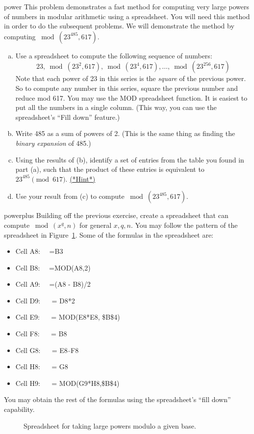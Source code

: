 \begin{exercise}{power}
This problem demonstrates a fast method for computing very large powers of numbers in modular arithmetic using a spreadsheet.  You will need this method in order to do the subsequent problems. We will demonstrate the method by computing $\bmod(23^{485} ,617)$.
\begin{enumerate}[(a)]
\item
Use a spreadsheet to compute the following sequence of numbers:
\[ 23, \bmod(23^2 ,617),\bmod(23^4 ,617),\ldots,\bmod(23^{256} ,617) \]
Note that each power of 23 in this series is the  \emph{square} of the previous power.  So to compute any number in this series, square the previous number and reduce mod 617.  You may use the MOD spreadsheet function.  It is easiest to put all the numbers in a single column. (This way, you can use the spreadsheet's ``Fill down'' feature.)
\item  Write 485 as a sum of powers of 2.  (This is the same thing as finding the \emph{binary expansion} of 485.)
\item Using the results of (b), identify a set of entries from the table you found in part (a), such that the product of these entries is equivalent to $23^{485}  \pmod{617}$.
\hyperref[sec:Cryptography:Hints]{(*Hint*)}
\item 
Use your result from (c) to compute $\bmod(23^{485} ,617)$.
\end{enumerate}
\end{exercise}

\begin{exercise}{powerplus}
Building off the previous exercise, create a spreadsheet that can compute $\bmod(x^{q},n)$ for general $x,q,n$.  You may follow the pattern of the spreadsheet in Figure~\ref{fig:LargePowMod}.  Some of the formulas in the spreadsheet are:
\begin{itemize}
\item
Cell A8: ~~=B3
\item
Cell B8: ~~=MOD(A8,2)
\item
Cell A9: ~~=(A8 - B8)/2
\item
Cell D9: ~~ = D8*2
\item
Cell E9: ~~ = MOD(E8*E8, \$B\$4)
\item
Cell F8: ~~ = B8
\item
Cell G8: ~~ = E8$\widehat{~~}$F8
\item
Cell H8: ~~ = G8
\item
Cell H9: ~~ = MOD(G9*H8,\$B\$4)
\end{itemize}
You may obtain the rest of the formulas using the spreadsheet's ``fill down'' capability.

\begin{figure}[h]
\caption{Spreadsheet for taking large powers modulo a given base.}
\label{fig:LargePowMod}
\end{figure}
\end{exercise} 



